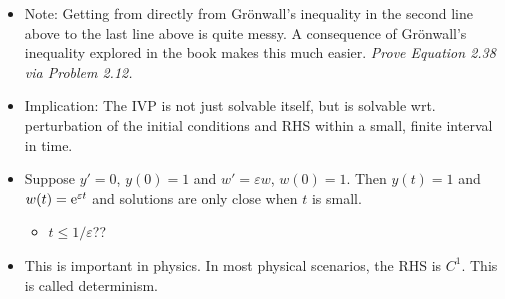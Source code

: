 \documentclass[../notes.tex]{subfiles}
\begin{document}
\begin{itemize}
\begin{proof}
\begin{align*}
            &= \left| [y_0-w_0]+\int_{t_0}^t[f(\tau,y(\tau))-g(\tau,y(\tau))]\dd\tau \right|\\
            &\leq |y_0-w_0|+\left| \int_{t_0}^t[f(\tau,y(\tau))-g(\tau,w(\tau))]\dd\tau \right|\\
            &\leq |y_0-w_0|+\int_{t_0}^t|f(\tau,y(\tau))-g(\tau,w(\tau))|\dd\tau
        \end{align*}
        where we get from the second to the third line using the triangle inequality, and the third to the fourth line using Theorem 13.26 of Honors Calculus IBL. We also know that
        \begin{align*}
            |f(\tau,y(\tau))-g(\tau,w(\tau))| &\leq |f(\tau,y(\tau))-f(\tau,w(\tau))|+|f(\tau,w(\tau))-g(\tau,w(\tau))|\\
            &\leq L|y(\tau)-w(\tau)|+M
        \end{align*}
        Combining what we've obtained, we have
        \begin{align*}
            \underbrace{|y(t)-w(t)|}_{\psi(t)} &\leq \underbrace{|y_0-w_0|+M(t-t_0)}_{f(t)}+\underbrace{\vphantom{|}L}_a\int_{t_0}^t\underbrace{|y(\tau)-w(\tau)|}_{\psi(t)}\dd\tau\\
            &\leq MT+|y_0-w_0|+L\int_{t_0}^t\e[L(t-\tau)][|y_0-w_0|+M(t-\tau)]\dd\tau\tag*{Gr\"{o}nwall}\\
            &\leq \e[LT]|y_0-w_0|+\frac{M}{L}(\e[TL]-1)
        \end{align*}
        as desired.
    \end{proof}
    \item Note: Getting from directly from Gr\"{o}nwall's inequality in the second line above to the last line above is quite messy. A consequence of Gr\"{o}nwall's inequality explored in the book makes this much easier. \emph{Prove Equation 2.38 via Problem 2.12.}
    \item Implication: The IVP is not just solvable itself, but is solvable wrt. perturbation of the initial conditions and RHS within a small, finite interval in time.
    \item Suppose $y'=0$, $y(0)=1$ and $w'=\varepsilon w$, $w(0)=1$. Then $y(t)=1$ and $w(t)=\e[\varepsilon t]$ and solutions are only close when $t$ is small.
    \begin{itemize}
        \item $t\leq 1/\varepsilon$??
    \end{itemize}
    \item This is important in physics. In most physical scenarios, the RHS is $C^1$. This is called determinism.
\end{itemize}
\end{document}
